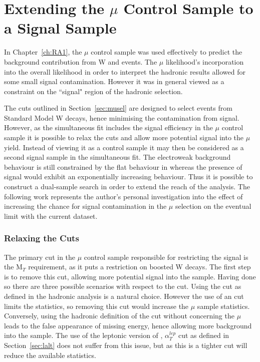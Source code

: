 \chapter{Extending the $\mu$ Control Sample to a Signal Sample}
\label{ch:ra4}

In Chapter~\ref{ch:RA1}, the $\mu$ control sample was used effectively to predict the background contribution from W and \tto events. The $\mu$ likelihood's incorporation into the overall likelihood in order to interpret the hadronic results allowed for some small signal contamination. However it was in general viewed as a constraint on the ``signal" region of the hadronic selection. 

The cuts outlined in Section~\ref{sec:musel} are designed to select events from Standard Model W decays, hence minimising the contamination from signal. However, as the simultaneous fit includes the signal efficiency in the $\mu$ control sample it is possible to relax the cuts and allow more potential signal into the $\mu$ yield. Instead of viewing it as a control sample it may then be considered as a second signal sample in the simultaneous fit. The electroweak background behaviour is still constrained by the flat behaviour in \RaT whereas the presence of signal would exhibit an exponentially increasing behaviour. Thus it is possible to construct a dual-sample search in order to extend the reach of the analysis.  The following work represents the author's personal investigation into the effect of increasing the chance for signal contamination in the $\mu$ selection on the eventual limit with the current dataset. 

\subsection{Relaxing the Cuts}

The primary cut in the $\mu$ control sample responsible for restricting the signal is the M$_{T}$ requirement, as it puts a restriction on boosted W decays. The first step is to remove this cut, allowing more potential signal into the sample. Having done so there are three possible scenarios with respect to the \alt cut. Using the \alt cut as defined in the hadronic analysis is a natural choice. However the use of an \alt cut limits the statistics, so removing this cut would increase the $\mu$ sample statistics. Conversely, using the hadronic definition of the \alt cut without concerning the $\mu$ leads to the false appearance of missing energy, hence allowing more background into the sample. The use of the leptonic version of \alt, $\alpha^{lep}_{T}$ cut as defined in Section~\ref{sec:lalt} does not suffer from this issue, but as this is a tighter cut will reduce the available statistics. 


